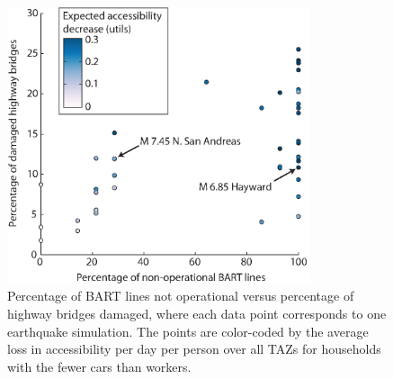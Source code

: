 





\begin{figure}[htb]
\centering
\includegraphics[width=3.5in]{FIGS/equity_bart_bridges_acc3vJWBv4.eps} 
\caption{Percentage of BART lines not operational versus percentage of highway bridges damaged, where each data point corresponds to one earthquake simulation. The points are color-coded by the average loss in accessibility per day per person over all TAZs for households with the fewer cars than workers.}
\label{fig:bartBri}
\end{figure}




